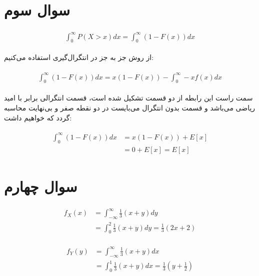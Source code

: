 \documentclass[paper=a4, fontsize=11pt]{article}
\numberwithin{equation}{section} %
\numberwithin{figure}{section} %
\numberwithin{table}{section} %
\begin{document}
\section{سوال سوم}

\begin{align}
\begin{split}
    \int_{0}^{\infty} P(X > x)dx
    = \int_{0}^{\infty} (1 - F(x))dx
\end{split}
\end{align}

از روش جز به جز در انتگرال‌گیری استفاده می‌کنیم:

\begin{align}
\begin{split}
    \int_{0}^{\infty} (1 - F(x))dx
    = x(1 - F(x)) - \int_{0}^{\infty} -xf(x)dx
\end{split}
\end{align}

سمت راست این رابطه از دو قسمت تشکیل شده است،
قسمت انتگرالی برابر با امید ریاضی 
می‌باشد و قسمت بدون انتگرال می‌بایست در دو نقطه صفر و بی‌نهایت
محاسبه گردد که خواهیم داشت:

\begin{align}
\begin{split}
    \int_{0}^{\infty} (1 - F(x))dx
    &= x(1 - F(x)) + E[x]\\
    &= 0 + E[x] = E[x]
\end{split}
\end{align}

\section{سوال چهارم}

\begin{align}
\begin{split}
    f_X(x) &= \int_{-\infty}^{\infty} \frac{1}{3}(x + y)dy \\
    &= \int_{0}^{2} \frac{1}{3}(x + y)dy = \frac{1}{3}(2x + 2)
\end{split}
\end{align}

\begin{align}
\begin{split}
    f_Y(y) &= \int_{-\infty}^{\infty} \frac{1}{3}(x + y)dx \\
    &= \int_{0}^{1} \frac{1}{3}(x + y)dx = \frac{1}{3}(y + \frac{1}{2})
\end{split}
\end{align}
\end{document}
